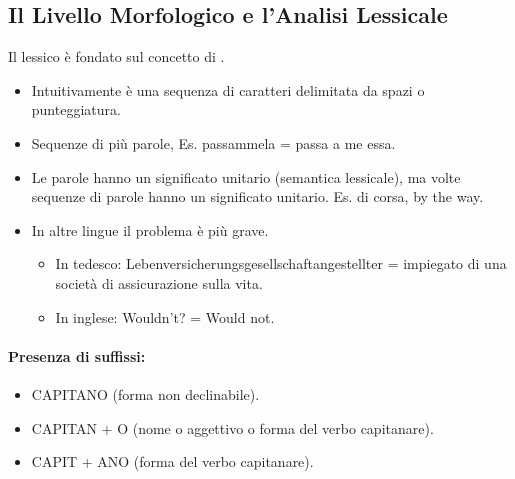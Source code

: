 


\subsection{Il Livello Morfologico e l'Analisi Lessicale}

Il lessico è fondato sul concetto di .


\begin{itemize}
  \item Intuitivamente è una
sequenza di caratteri delimitata da spazi o
punteggiatura. 
\item Sequenze di più parole, Es. passammela = passa a me essa. 
\item Le parole hanno un significato unitario (semantica
lessicale), ma volte sequenze di parole hanno un
significato unitario. Es. di corsa, by the way. 
\item In altre lingue il problema è più grave. 
  \begin{itemize}
    \item In tedesco: Lebenversicherungsgesellschaftangestellter = impiegato di una società di
assicurazione sulla vita. 
  \item In inglese: Wouldn't? = Would not.
  \end{itemize}
\end{itemize}

\paragraph{Presenza di suffissi:}

\begin{itemize}
  \item CAPITANO (forma non declinabile). 
  \item CAPITAN + O (nome o aggettivo o forma del verbo capitanare). 
  \item CAPIT + ANO (forma del verbo capitanare).
\end{itemize}

